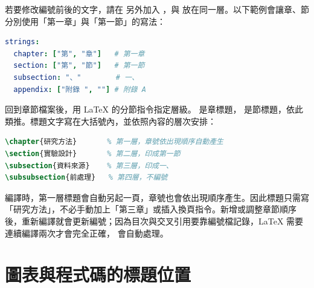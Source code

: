 若要修改編號前後的文字，請在  另外加入 ，與  放在同一層。以下範例會讓章、節分別使用「第一章」與「第一節」的寫法：

\begin{lstlisting}[language=yaml]
strings:
  chapter: ["第", "章"]   # 第一章
  section: ["第", "節"]   # 第一節
  subsection: "、"        # 一、
  appendix: ["附錄 ", ""] # 附錄 A
\end{lstlisting}

回到章節檔案後，用 \LaTeX{} 的分節指令指定層級。\code{\chapter} 是章標題，\code{\section} 是節標題，依此類推。標題文字寫在大括號內，並依照內容的層次安排：

\begin{lstlisting}[language=latex]
\chapter{研究方法}       % 第一層，章號依出現順序自動產生
\section{實驗設計}       % 第二層，印成第一節
\subsection{資料來源}    % 第三層，印成一、
\subsubsection{前處理}   % 第四層，不編號
\end{lstlisting}

編譯時，第一層標題會自動另起一頁，章號也會依出現順序產生。因此標題只需寫「研究方法」，不必手動加上「第三章」或插入換頁指令。新增或調整章節順序後，重新編譯就會更新編號；因為目次與交叉引用要靠編號檔記錄，\LaTeX{} 需要連續編譯兩次才會完全正確， 會自動處理。

\section{圖表與程式碼的標題位置}\label{sec:caption}

